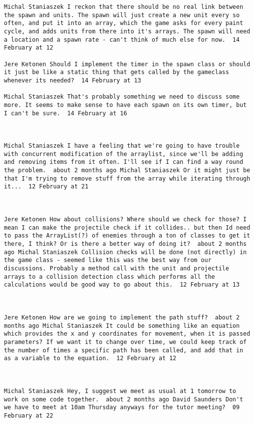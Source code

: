 \begin{verbatim}
Michal Staniaszek I reckon that there should be no real link between
the spawn and units. The spawn will just create a new unit every so
often, and put it into an array, which the game asks for every paint
cycle, and adds units from there into it's arrays. The spawn will need
a location and a spawn rate - can't think of much else for now.  14
February at 12

Jere Ketonen Should I implement the timer in the spawn class or should
it just be like a static thing that gets called by the gameclass
whenever its needed?  14 February at 13

Michal Staniaszek That's probably something we need to discuss some
more. It seems to make sense to have each spawn on its own timer, but
I can't be sure.  14 February at 16



Michal Staniaszek I have a feeling that we're going to have trouble
with concurrent modification of the arraylist, since we'll be adding
and removing items from it often. I'll see if I can find a way round
the problem.  about 2 months ago Michal Staniaszek Or it might just be
that I'm trying to remove stuff from the array while iterating through
it...  12 February at 21



Jere Ketonen How about collisions? Where should we check for those? I
mean I can make the projectile check if it collides.. but then Id need
to pass the ArrayList(?) of enemies through a ton of classes to get it
there, I think? Or is there a better way of doing it?  about 2 months
ago Michal Staniaszek Collision checks will be done (not directly) in
the game class - seemed like this was the best way from our
discussions. Probably a method call with the unit and projectile
arrays to a collision detection class which performs all the
calculations would be good way to go about this.  12 February at 13



Jere Ketonen How are we going to implement the path stuff?  about 2
months ago Michal Staniaszek It could be something like an equation
which provides the x and y coordinates for movement, when it is passed
parameters? If we want it to change over time, we could keep track of
the number of times a specific path has been called, and add that in
as a variable to the equation.  12 February at 12



Michal Staniaszek Hey, I suggest we meet as usual at 1 tomorrow to
work on some code together.  about 2 months ago David Saunders Don't
we have to meet at 10am Thursday anyways for the tutor meeting?  09
February at 22


\end{verbatim}
